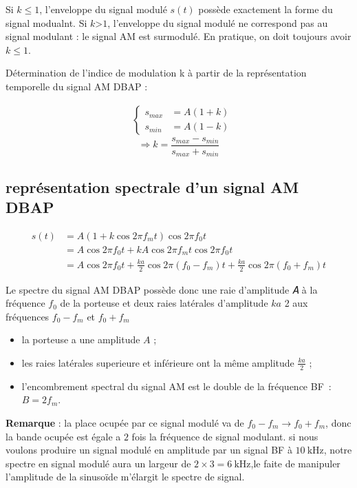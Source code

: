 \documentclass[12pt,a4paper,hidelinks,oneside]{book}
\begin{document}
Si $k \leq 1$, l’enveloppe du signal modulé $s\left(t\right)$ possède exactement la forme du signal modualnt. Si $k $>$ 1$, l’enveloppe du signal modulé ne correspond pas au signal modulant : le signal AM est surmodulé.
En pratique, on doit toujours avoir $ k \leq 1$.

Détermination de l’indice de modulation k à partir de la représentation temporelle du signal AM
DBAP :


 

\begin{align*}
&
\begin{cases}
s_{max} &=A\left(1+k\right)\\
s_{min} &=A\left(1-k\right)
\end{cases}       
\end{align*}
\begin{equation}
\Rightarrow  k=\frac{s_{max}-s_{min}}{s_{max}+s_{min} }
\end{equation}

\subsection{représentation spectrale d’un signal AM DBAP}

\begin{align*}
s\left(t\right) &= A \left(1+ k \cos 2 \pi f_{m} t\right) \cos 2 \pi f_{0} t \\
 &= A \cos 2 \pi f_{0} t + k A \cos 2 \pi f_{m} t \cos 2 \pi f_{0} t \\ 
 &= A \cos 2 \pi f_{0} t + \frac{ka}{2} \cos 2 \pi \left(f_{0}-f_{m}\right) t + \frac{ka}{2} \cos 2 \pi \left(f_{0} + f_{m}\right) t 
\end{align*}

Le spectre du signal AM DBAP possède donc une raie d’amplitude 𝐴 à la fréquence $f_{0}$ de la porteuse
et deux raies latérales d’amplitude $ka$
2
aux fréquences $f_{0}-f_{m}$ et $f_{0}+f_{m}$

\begin{itemize}
	\item la porteuse a une amplitude $A$ ;
	\item les raies latérales superieure et inférieure ont la même amplitude $\frac{ka}{2}$ ;
	\item l'encombrement spectral du signal AM est le double de la fréquence \mbox{BF :} $B=2f_{m}$.
	
\end{itemize}

	\noindent\textbf{Remarque} : la place ocupée par ce signal modulé va de $f_{0}-f_{m} \rightarrow f_{0}+f_{m}$, donc la bande ocupée est égale a $2$ fois la fréquence de signal modulant. si nous voulons produire un signal modulé en amplitude par un signal BF à $\SI{10}{\kilo\hertz}$, notre spectre en signal modulé aura un largeur de  $ 2\times3= \SI{6}{\kilo\hertz}$,le faite de manipuler l'amplitude de la sinusoïde m'élargit le spectre de signal. 
	
\end{document}
